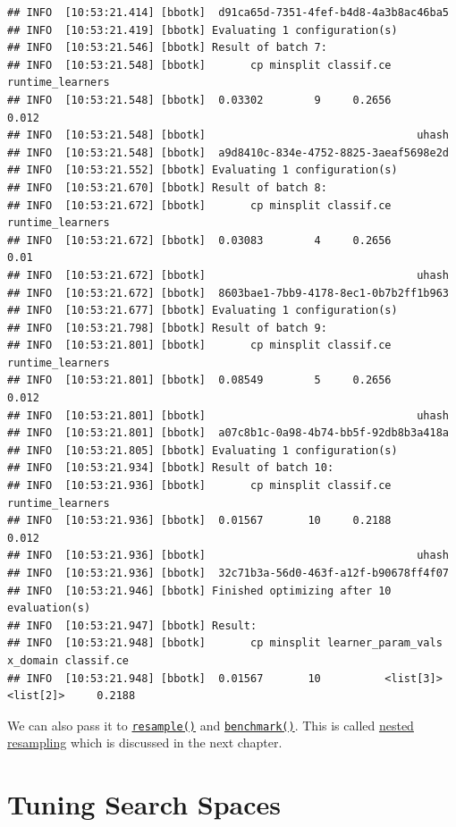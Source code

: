 \documentclass[
]{scrbook}
\begin{document}
\begin{verbatim}
## INFO  [10:53:21.414] [bbotk]  d91ca65d-7351-4fef-b4d8-4a3b8ac46ba5 
## INFO  [10:53:21.419] [bbotk] Evaluating 1 configuration(s) 
## INFO  [10:53:21.546] [bbotk] Result of batch 7: 
## INFO  [10:53:21.548] [bbotk]       cp minsplit classif.ce runtime_learners 
## INFO  [10:53:21.548] [bbotk]  0.03302        9     0.2656            0.012 
## INFO  [10:53:21.548] [bbotk]                                 uhash 
## INFO  [10:53:21.548] [bbotk]  a9d8410c-834e-4752-8825-3aeaf5698e2d 
## INFO  [10:53:21.552] [bbotk] Evaluating 1 configuration(s) 
## INFO  [10:53:21.670] [bbotk] Result of batch 8: 
## INFO  [10:53:21.672] [bbotk]       cp minsplit classif.ce runtime_learners 
## INFO  [10:53:21.672] [bbotk]  0.03083        4     0.2656             0.01 
## INFO  [10:53:21.672] [bbotk]                                 uhash 
## INFO  [10:53:21.672] [bbotk]  8603bae1-7bb9-4178-8ec1-0b7b2ff1b963 
## INFO  [10:53:21.677] [bbotk] Evaluating 1 configuration(s) 
## INFO  [10:53:21.798] [bbotk] Result of batch 9: 
## INFO  [10:53:21.801] [bbotk]       cp minsplit classif.ce runtime_learners 
## INFO  [10:53:21.801] [bbotk]  0.08549        5     0.2656            0.012 
## INFO  [10:53:21.801] [bbotk]                                 uhash 
## INFO  [10:53:21.801] [bbotk]  a07c8b1c-0a98-4b74-bb5f-92db8b3a418a 
## INFO  [10:53:21.805] [bbotk] Evaluating 1 configuration(s) 
## INFO  [10:53:21.934] [bbotk] Result of batch 10: 
## INFO  [10:53:21.936] [bbotk]       cp minsplit classif.ce runtime_learners 
## INFO  [10:53:21.936] [bbotk]  0.01567       10     0.2188            0.012 
## INFO  [10:53:21.936] [bbotk]                                 uhash 
## INFO  [10:53:21.936] [bbotk]  32c71b3a-56d0-463f-a12f-b90678ff4f07 
## INFO  [10:53:21.946] [bbotk] Finished optimizing after 10 evaluation(s) 
## INFO  [10:53:21.947] [bbotk] Result: 
## INFO  [10:53:21.948] [bbotk]       cp minsplit learner_param_vals  x_domain classif.ce 
## INFO  [10:53:21.948] [bbotk]  0.01567       10          <list[3]> <list[2]>     0.2188
\end{verbatim}

We can also pass it to \href{https://mlr3.mlr-org.com/reference/resample.html}{\texttt{resample()}} and \href{https://mlr3.mlr-org.com/reference/benchmark.html}{\texttt{benchmark()}}. This is called \protect\hyperlink{nested-resampling}{nested resampling} which is discussed in the next chapter.

\hypertarget{searchspace}{%
\section{Tuning Search Spaces}\label{searchspace}}
\end{document}
